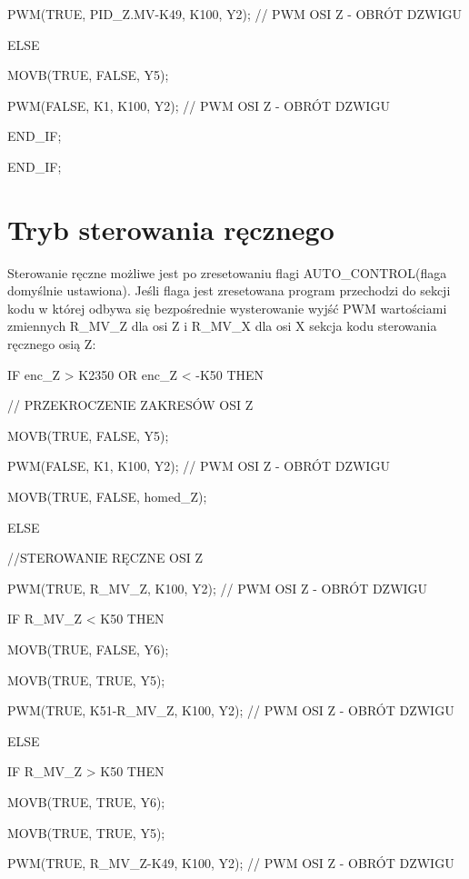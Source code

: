 \documentclass{mwrep}
\begin{document}
\quad \quad \quad PWM(TRUE, PID\_Z.MV-K49, K100, Y2); // PWM OSI Z - OBRÓT DZWIGU		

\quad \quad \quad ELSE	

\quad \quad \quad MOVB(TRUE, FALSE, Y5);

\quad \quad \quad PWM(FALSE, K1, K100, Y2); // PWM OSI Z - OBRÓT DZWIGU	

\quad \quad END\_IF;

\quad END\_IF;




\section{Tryb sterowania ręcznego}
\label{PLC::Reka}

Sterowanie ręczne możliwe jest po zresetowaniu flagi AUTO\_CONTROL(flaga domyślnie ustawiona). Jeśli flaga jest zresetowana program przechodzi do sekcji kodu w której odbywa się bezpośrednie wysterowanie wyjść PWM wartościami zmiennych R\_MV\_Z dla osi Z i R\_MV\_X dla osi X
sekcja kodu sterowania ręcznego osią Z:

\quad IF enc\_Z > K2350 OR enc\_Z < -K50 THEN

\quad \quad // PRZEKROCZENIE ZAKRESÓW OSI Z

\quad \quad MOVB(TRUE, FALSE, Y5);

\quad \quad PWM(FALSE, K1, K100, Y2); // PWM OSI Z - OBRÓT DZWIGU

\quad \quad MOVB(TRUE, FALSE, homed\_Z);

\quad \quad ELSE

\quad \quad //STEROWANIE RĘCZNE OSI Z

\quad \quad PWM(TRUE, R\_MV\_Z, K100, Y2);	// PWM OSI Z - OBRÓT DZWIGU

\quad \quad IF R\_MV\_Z < K50 THEN

\quad \quad \quad MOVB(TRUE, FALSE, Y6);

\quad \quad \quad MOVB(TRUE, TRUE, Y5);

\quad \quad \quad PWM(TRUE, K51-R\_MV\_Z, K100, Y2); 	// PWM OSI Z - OBRÓT DZWIGU	

\quad \quad \quad ELSE 

\quad \quad \quad IF R\_MV\_Z > K50 THEN

\quad \quad \quad \quad MOVB(TRUE, TRUE, Y6);

\quad \quad \quad \quad MOVB(TRUE, TRUE, Y5);

\quad \quad \quad \quad PWM(TRUE, R\_MV\_Z-K49, K100, Y2); // PWM OSI Z - OBRÓT DZWIGU
\end{document}
